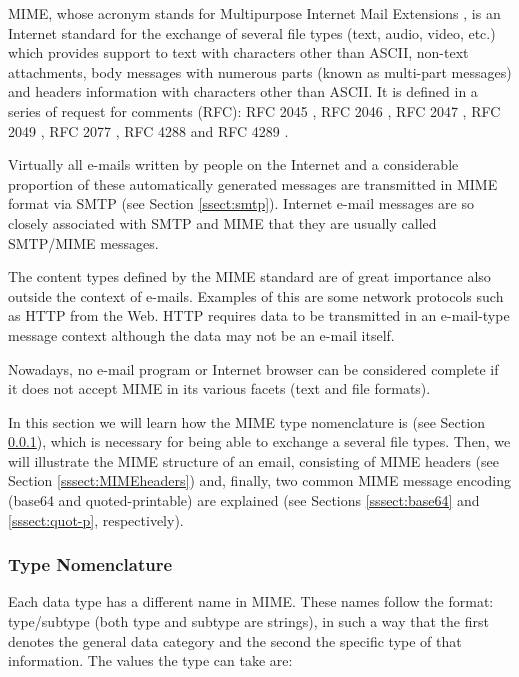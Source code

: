 MIME, whose acronym stands for Multipurpose Internet Mail Extensions \citep{wikimime}, is an Internet standard for the exchange of several file types (text, audio, video, etc.) which provides support to text with characters other than ASCII, non-text attachments, body messages with numerous parts (known as multi-part messages) and headers information with characters other than ASCII. It is defined in a series of request for comments (RFC): RFC 2045 \citep{rfc2045}, RFC 2046 \citep{rfc2046}, RFC 2047 \citep{rfc2047}, RFC 2049 \citep{rfc2049}, RFC 2077 \citep{rfc2077}, RFC 4288 \citep{rfc4288} and RFC 4289 \citep{rfc4289}.

Virtually all e-mails written by people on the Internet and a considerable proportion of these automatically generated messages are transmitted in MIME format via SMTP (see Section \ref{ssect:smtp}). Internet e-mail messages are so closely associated with SMTP and MIME that they are usually called SMTP/MIME messages.

The content types defined by the MIME standard are of great importance also outside the context of e-mails. Examples of this are some network protocols such as HTTP from the Web. HTTP requires data to be transmitted in an e-mail-type message context although the data may not be an e-mail itself.

Nowadays, no e-mail program or Internet browser can be considered complete if it does not accept MIME in its various facets (text and file formats). 

In this section we will learn how the MIME type nomenclature is (see Section \ref{sssect:MIMEtype}), which is necessary for being able to exchange a several file types. Then, we will illustrate the MIME structure of an email, consisting of MIME headers (see Section \ref{sssect:MIMEheaders}) and, finally, two common MIME message encoding (base64 and quoted-printable) are explained (see Sections \ref{sssect:base64} and \ref{sssect:quot-p}, respectively).

\subsubsection{Type Nomenclature}\label{sssect:MIMEtype}

Each data type has a different name in MIME. These names follow the format: type/subtype (both type and subtype are strings), in such a way that the first denotes the general data category and the second the specific type of that information. The values the type can take are:

